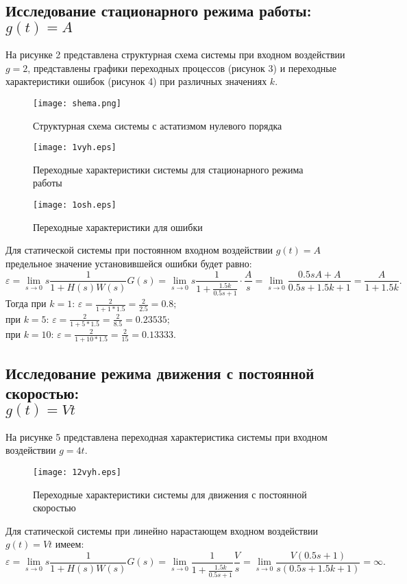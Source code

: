 \documentclass[12pt,a4paper]{article}
\begin{document}
\subsection{Исследование стационарного режима работы: $g(t)=A$} 
На рисунке 2 представлена структурная схема системы при входном воздействии \\$g=2$, представлены графики переходных процессов (рисунок 3) и переходные характеристики ошибок (рисунок 4) при различных значениях $k$. 
\begin{figure}[h!]
	\centering
	\texttt{[image: shema.png]}
	\caption{Структурная схема системы с астатизмом нулевого порядка}
\end{figure}
\begin{figure}[H]
	\centering
	\texttt{[image: 1vyh.eps]}
	\caption{Переходные характеристики системы для стационарного режима работы}
\end{figure}
\begin{figure}[H]
	\centering
	\texttt{[image: 1osh.eps]}
	\caption{Переходные характеристики для ошибки}
\end{figure}
Для статической системы при постоянном входном воздействии $g(t)=A$ предельное значение установившейся ошибки будет равно:
\begin{equation}
    \varepsilon = \lim_{s\to 0}s\frac{1}{1+H(s)W(s)}G(s) = \lim_{s\to0} s\frac{1}{1+ \displaystyle{\frac{1.5k}{0.5s+1}}}\cdot\frac{A}{s} = \lim_{s\to0} \frac{0.5sA+A}{0.5s+1.5k+1} = \frac{A}{1+1.5k}.
\end{equation}
Тогда при $k=1$: $\varepsilon = \displaystyle{\frac{2}{1+1*1.5}} = \frac{2}{2.5} = 0.8;$\\
при $k=5$: $\varepsilon = \displaystyle{\frac{2}{1+5*1.5}} = \frac{2}{8.5} = 0.23535;$\\
при $k=10$: $\varepsilon = \displaystyle{\frac{2}{1+10*1.5}} = \frac{2}{15} = 0.13333.$\\

\subsection{Исследование режима движения с постоянной скоростью: \\$g(t)=Vt$} 
На рисунке 5 представлена переходная характеристика системы при входном воздействии $g=4t$.
\begin{figure}[H]
	\centering
	\texttt{[image: 12vyh.eps]}
	\caption{Переходные характеристики системы для движения с постоянной скоростью}
\end{figure}
Для статической системы при линейно нарастающем входном воздействии $g(t)=Vt$ имеем:
\begin{equation}
    \varepsilon = \lim_{s\to0} s\frac{1}{1+H(s)W(s)}G(s) = \lim_{s\to0} \frac{1}{1+\displaystyle{\frac{1.5k}{0.5s+1}}}\frac{V}{s} = \lim_{s\to0} \frac{V(0.5s+1)}{s(0.5s+1.5k+1)} = \infty.
\end{equation}
\end{document}

